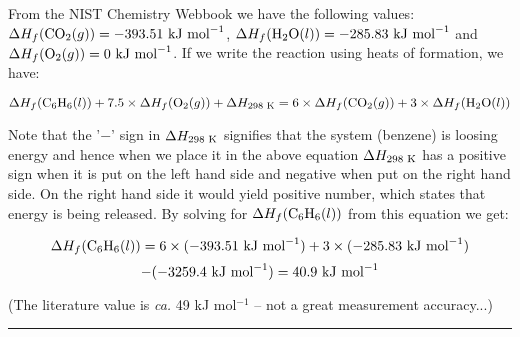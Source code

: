 From the NIST Chemistry Webbook we have the following values: $\Delta H_f(\textnormal{CO}_2(g)) = -393.51\textnormal{ kJ mol}^{-1}$, $\Delta H_f(\textnormal{H}_2\textnormal{O}(l)) = -285.83\textnormal{ kJ mol}^{-1}$ and $\Delta H_f(\textnormal{O}_2(g)) = 0\textnormal{ kJ mol}^{-1}$. If we write the reaction using heats of formation, we have:

$$\Delta H_f(\textnormal{C}_6\textnormal{H}_6(l)) + 7.5 \times \Delta H_f(\textnormal{O}_2(g)) + \Delta H_{298\textnormal{ K}} = 6 \times \Delta H_f(\textnormal{CO}_2(g)) + 3 \times \Delta H_f(\textnormal{H}_2\textnormal{O}(l))$$

Note that the '$-$' sign in $\Delta H_{298\textnormal{ K}}$ signifies that the system (benzene) is loosing energy and hence when we place it in the above equation $\Delta H_{298\textnormal{ K}}$ has a positive sign when it is put on the left hand side and negative when put on the right hand side. On the right hand side it would yield positive number, which states that energy is being released. By solving for $\Delta H_f(\textnormal{C}_6\textnormal{H}_6(l))$ from this equation we get:

$$\Delta H_f(\textnormal{C}_6\textnormal{H}_6(l)) = 6 \times (-393.51\textnormal{ kJ mol}^{-1}) + 3 \times (-285.83\textnormal{ kJ mol}^{-1})$$
$$ - (-3259.4\textnormal{ kJ mol}^{-1}) = 40.9\textnormal{ kJ mol}^{-1}$$

(The literature value is \textit{ca.} 49 kJ mol$^{-1}$ -- not a great measurement accuracy...)

\hrule\vspace{0.5cm}
